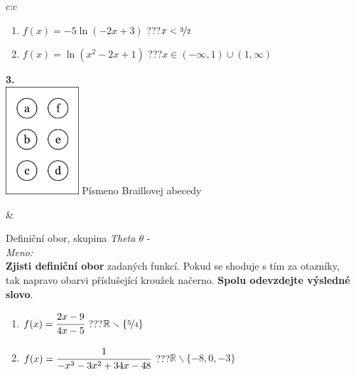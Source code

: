 \documentclass[10pt]{report}
\begin{document}
\begin{tabular}{c:c}
\begin{minipage}[c][99mm][t]{0.49\linewidth}
\begin{center}
\begin{minipage}{0.77\linewidth}
\begin{center}
\begin{varwidth}{\textwidth}
\begin{enumerate}
\item $f(x)=-5\ln{(-2x+3)}$\quad \dotfill\; ???\;\dotfill \quad $x<\nicefrac{3}{2}$
\item $f(x)=\ln{(x^2-2x+1)}$\quad \dotfill\; ???\;\dotfill \quad $x\in(-\infty , 1)\cup(1 , \infty)$
\end{enumerate}
\end{varwidth}
\end{center}
\end{minipage}
\begin{minipage}{0.20\linewidth}
\begin{center}
{\Huge\bfseries 3.} \\[2mm]
\includegraphics[height=40mm]{../images/braille.png}
{\small Písmeno Braillovej abecedy}
\end{center}
\end{minipage}
\end{center}
\end{minipage}
&
\begin{minipage}[c][99mm][t]{0.49\linewidth}
\begin{center}
\vspace{7mm}
{\huge Definiční obor, skupina \textit{Theta $\theta$} -}\\[4.5mm]
\textit{Meno:}\phantom{xxxxxxxxxxxxxxxxxxxxxxxxxxxxxxxxxxxxxxxxxxxxxxxxxxxxxxxxxxxxxxxxx}\\[3.5mm]
\textbf{Zjisti definiční obor} zadaných funkcí. Pokud se shoduje s tím za otazníky,\\tak napravo obarvi příslušející kroužek načerno. \textbf{Spolu odevzdejte výsledné slovo}.\\[3mm]
\begin{minipage}{0.77\linewidth}
\begin{center}
\begin{varwidth}{\textwidth}
\begin{enumerate}
\normalsize
\item $f(x)=\cfrac{2x-9}{4x-5}$\quad \dotfill\; ???\;\dotfill \quad $\mathbb{R}\smallsetminus\{\nicefrac{5}{4}\}$
\item $f(x)=\cfrac{1}{-x^3-3x^2+34x-48}$\quad \dotfill\; ???\;\dotfill \quad $\mathbb{R}\smallsetminus\{-8,0,-3\}$

\end{enumerate}
\end{varwidth}
\end{center}
\end{minipage}
\end{center}
\end{minipage}
\end{tabular}
\end{document}
